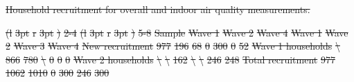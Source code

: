 \documentclass[
  letterpaper,
  DIV=11,
  numbers=noendperiod]{scrartcl}
\makeatletter
\renewenvironment{table}%
   {\renewcommand\familydefault\sfdefault
    \@float{table}}
   {\end@float}
\providecommand{\DIFadd}[1]{{\protect\color{blue}\underline{#1}}} %
\providecommand{\DIFdel}[1]{{\protect\color{red}\sout{#1}}}                      %
\providecommand{\DIFdelbegin}{} %
\providecommand{\DIFdelend}{} %
\providecommand{\DIFaddFL}[1]{\DIFadd{#1}} %
\providecommand{\DIFdelFL}[1]{\DIFdel{#1}} %
\providecommand{\DIFaddbeginFL}{} %
\providecommand{\DIFdelbeginFL}{} %
\providecommand{\DIFdelendFL}{} %
\newcommand{\DIFscaledelfig}{0.5}
\newlength{\DIFdelgraphicswidth} %
\newlength{\DIFdelgraphicsheight} %
\newcommand{\DIFaddincludegraphics}[2][]{{\color{blue}\fbox{\DIFOincludegraphics[#1]{#2}}}} %
\newcommand{\DIFdelincludegraphics}[2][]{%
\sbox{\DIFdelgraphicsbox}{\DIFOincludegraphics[#1]{#2}}%
\settoboxwidth{\DIFdelgraphicswidth}{\DIFdelgraphicsbox} %
\settoboxtotalheight{\DIFdelgraphicsheight}{\DIFdelgraphicsbox} %
\scalebox{\DIFscaledelfig}{%
\parbox[b]{\DIFdelgraphicswidth}{\usebox{\DIFdelgraphicsbox}\\[-\baselineskip] \rule{\DIFdelgraphicswidth}{0em}}\llap{\resizebox{\DIFdelgraphicswidth}{\DIFdelgraphicsheight}{%
\setlength{\unitlength}{\DIFdelgraphicswidth}%
\begin{picture}(1,1)%
\thicklines\linethickness{2pt} %
{\color[rgb]{1,0,0}\put(0,0){\framebox(1,1){}}}%
{\color[rgb]{1,0,0}\put(0,0){\line( 1,1){1}}}%
{\color[rgb]{1,0,0}\put(0,1){\line(1,-1){1}}}%
\end{picture}%
}\hspace*{3pt}}} %
} %
\DeclareRobustCommand{\DIFdelbegin}{\DIFOdelbegin \let\includegraphics\DIFdelincludegraphics} %
\DeclareRobustCommand{\DIFdelend}{\DIFOaddend \let\includegraphics\DIFOincludegraphics} %
\DeclareRobustCommand{\DIFaddbeginFL}{\DIFOaddbeginFL \let\includegraphics\DIFaddincludegraphics} %
\DeclareRobustCommand{\DIFdelbeginFL}{\DIFOdelbeginFL \let\includegraphics\DIFdelincludegraphics} %
\DeclareRobustCommand{\DIFdelendFL}{\DIFOaddendFL \let\includegraphics\DIFOincludegraphics} %
\makeatother
\begin{document}
\DIFdelbegin %
\DIFdelend \begin{table}
\DIFdelbeginFL %
{%
\DIFdelFL{Household recruitment for overall and indoor air quality measurements. }}%
\DIFdelendFL 

\DIFdelbeginFL %
\DIFdelFL{(l}%
\DIFdelFL{3pt}%
\DIFdelFL{r}%
\DIFdelFL{3pt}%
\DIFdelFL{)}%
\DIFdelFL{2-4}%
\DIFdelFL{(l}%
\DIFdelFL{3pt}%
\DIFdelFL{r}%
\DIFdelFL{3pt}%
\DIFdelFL{)}%
\DIFdelFL{5-8}%
\DIFdelFL{Sample }%
\DIFdelFL{Wave 1 }%
\DIFdelFL{Wave 2 }%
\DIFdelFL{Wave 4 }%
\DIFdelFL{Wave 1 }%
\DIFdelFL{Wave 2 }%
\DIFdelFL{Wave 3 }%
\DIFdelFL{Wave 4}%
\DIFdelFL{New recruitment }%
\DIFdelFL{977 }%
\DIFdelFL{196 }%
\DIFdelFL{68 }%
\DIFdelFL{0 }%
\DIFdelFL{300 }%
\DIFdelFL{0 }%
\DIFdelFL{52}%
\DIFdelFL{Wave 1 households }%
\DIFdelFL{\textbackslash{} }%
\DIFdelFL{866 }%
\DIFdelFL{780 }%
\DIFdelFL{\textbackslash{} }%
\DIFdelFL{0 }%
\DIFdelFL{0 }%
\DIFdelFL{0}%
\DIFdelFL{Wave 2 households }%
\DIFdelFL{\textbackslash{} }%
\DIFdelFL{\textbackslash{} }%
\DIFdelFL{162 }%
\DIFdelFL{\textbackslash{} }%
\DIFdelFL{\textbackslash{} }%
\DIFdelFL{246 }%
\DIFdelFL{248}%
\DIFdelFL{Total recruitment }%
\DIFdelFL{977 }%
\DIFdelFL{1062 }%
\DIFdelFL{1010 }%
\DIFdelFL{0 }%
\DIFdelFL{300 }%
\DIFdelFL{246 }%
\DIFdelFL{300}%
\DIFdelendFL \DIFaddbeginFL \caption{\label{tbl-pm-sample}\DIFaddFL{Household recruitment for overall and
indoor air quality measurements.}}


\end{table}
\end{document}
